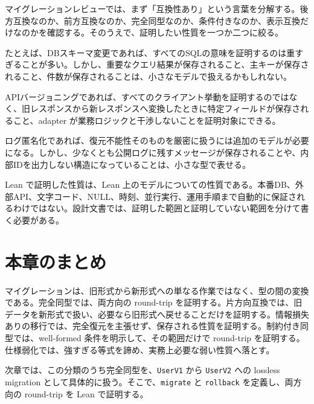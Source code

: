 \begin{softwarebox}
マイグレーションレビューでは、まず「互換性あり」という言葉を分解する。後方互換なのか、前方互換なのか、完全同型なのか、条件付きなのか、表示互換だけなのかを確認する。そのうえで、証明したい性質を一つか二つに絞る。
\end{softwarebox}

たとえば、DBスキーマ変更であれば、すべてのSQLの意味を証明するのは重すぎることが多い。しかし、重要なクエリ結果が保存されること、主キーが保存されること、件数が保存されることは、小さなモデルで扱えるかもしれない。

APIバージョニングであれば、すべてのクライアント挙動を証明するのではなく、旧レスポンスから新レスポンスへ変換したときに特定フィールドが保存されること、adapter が業務ロジックと干渉しないことを証明対象にできる。

ログ匿名化であれば、復元不能性そのものを厳密に扱うには追加のモデルが必要になる。しかし、少なくとも公開ログに残すメッセージが保存されることや、内部IDを出力しない構造になっていることは、小さな型で表せる。

\begin{warningbox}
Lean で証明した性質は、Lean 上のモデルについての性質である。本番DB、外部API、文字コード、NULL、時刻、並行実行、運用手順まで自動的に保証されるわけではない。設計文書では、証明した範囲と証明していない範囲を分けて書く必要がある。
\end{warningbox}

\section{本章のまとめ}

マイグレーションは、旧形式から新形式への単なる作業ではなく、型の間の変換である。完全同型では、両方向の round-trip を証明する。片方向互換では、旧データを新形式で扱い、必要なら旧形式へ戻せることだけを証明する。情報損失ありの移行では、完全復元を主張せず、保存される性質を証明する。制約付き同型では、well-formed 条件を明示して、その範囲だけで round-trip を証明する。仕様弱化では、強すぎる等式を諦め、実務上必要な弱い性質へ落とす。

次章では、この分類のうち完全同型を、\texttt{UserV1} から \texttt{UserV2} への lossless migration として具体的に扱う。そこで、\texttt{migrate} と \texttt{rollback} を定義し、両方向の round-trip を Lean で証明する。
